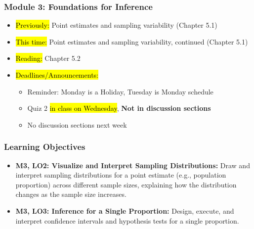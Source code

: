 
\begin{frame}
    \frametitle{Module 3: Foundations for Inference}
    \begin{itemize}
        \item \hl{Previously: }Point estimates and sampling variability (Chapter 5.1)
        \item \hl{This time: }Point estimates and sampling variability, continued (Chapter 5.1)
        \item \hl{Reading: }Chapter 5.2
        \item \hl{Deadlines/Announcements: }
        \begin{itemize}
            \item Reminder: Monday is a Holiday, Tuesday is Monday schedule
            \item Quiz 2 \hl{in class on Wednesday}, \textbf{Not in discussion sections}
            \item No discussion sections next week
        \end{itemize}
    \end{itemize}

\end{frame}

\begin{frame}
    \frametitle{Learning Objectives}
    \begin{itemize}
        \item \textbf{M3, LO2: Visualize and Interpret Sampling Distributions:} Draw and interpret sampling distributions for a point estimate (e.g., population proportion) across different sample sizes, explaining how the distribution changes as the sample size increases.
        \item \textbf{M3, LO3: Inference for a Single Proportion:} Design, execute, and interpret confidence intervals and hypothesis tests for a single proportion.
    \end{itemize}
\end{frame}
